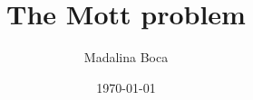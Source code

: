 \documentclass[fleqn]{book}
\title{The Mott problem}
\author{Madalina Boca}
\date{\today}
\begin{document}
\maketitle
\tableofcontents

%


\cite{bessel}



\end{document}
